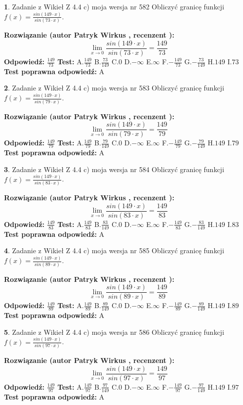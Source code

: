 \documentclass[12pt, a4paper]{article}
\theoremstyle{definition} %
\newtheorem{zad}{}
\newcommand{\zadStart}[1]{\begin{zad}#1\newline}
\newcommand{\zadStop}{\end{zad}}
\newcommand{\rozwStart}[2]{\noindent \textbf{Rozwiązanie (autor #1 , recenzent #2): }\newline}
\newcommand{\rozwStop}{\newline}
\newcommand{\odpStart}{\noindent \textbf{Odpowiedź:}\newline}
\newcommand{\odpStop}{\newline}
\newcommand{\testStart}{\noindent \textbf{Test:}\newline}
\newcommand{\testStop}{\newline}
\newcommand{\kluczStart}{\noindent \textbf{Test poprawna odpowiedź:}\newline}
\newcommand{\kluczStop}{\newline}
\begin{document}
\zadStart{Zadanie z Wikieł Z 4.4 c) moja wersja nr 582}
Obliczyć granicę funkcji $f(x)=\frac{sin(149\cdot x)}{sin(73\cdot x)}$.
\zadStop
\rozwStart{Patryk Wirkus}{}
$$\lim\limits_{x\to 0}\frac{sin(149\cdot x)}{sin(73\cdot x)}=
\frac{149}{73}$$
\rozwStop
\odpStart
$\frac{149}{73}$
\odpStop
\testStart
A.$\frac{149}{73}$
B.$\frac{73}{149}$
C.$0$
D.$-\infty$
E.$\infty$
F.$-\frac{149}{73}$
G.$-\frac{73}{149}$
H.$149$
I.$73$
\testStop
\kluczStart
A
\kluczStop



\zadStart{Zadanie z Wikieł Z 4.4 c) moja wersja nr 583}
Obliczyć granicę funkcji $f(x)=\frac{sin(149\cdot x)}{sin(79\cdot x)}$.
\zadStop
\rozwStart{Patryk Wirkus}{}
$$\lim\limits_{x\to 0}\frac{sin(149\cdot x)}{sin(79\cdot x)}=
\frac{149}{79}$$
\rozwStop
\odpStart
$\frac{149}{79}$
\odpStop
\testStart
A.$\frac{149}{79}$
B.$\frac{79}{149}$
C.$0$
D.$-\infty$
E.$\infty$
F.$-\frac{149}{79}$
G.$-\frac{79}{149}$
H.$149$
I.$79$
\testStop
\kluczStart
A
\kluczStop



\zadStart{Zadanie z Wikieł Z 4.4 c) moja wersja nr 584}
Obliczyć granicę funkcji $f(x)=\frac{sin(149\cdot x)}{sin(83\cdot x)}$.
\zadStop
\rozwStart{Patryk Wirkus}{}
$$\lim\limits_{x\to 0}\frac{sin(149\cdot x)}{sin(83\cdot x)}=
\frac{149}{83}$$
\rozwStop
\odpStart
$\frac{149}{83}$
\odpStop
\testStart
A.$\frac{149}{83}$
B.$\frac{83}{149}$
C.$0$
D.$-\infty$
E.$\infty$
F.$-\frac{149}{83}$
G.$-\frac{83}{149}$
H.$149$
I.$83$
\testStop
\kluczStart
A
\kluczStop



\zadStart{Zadanie z Wikieł Z 4.4 c) moja wersja nr 585}
Obliczyć granicę funkcji $f(x)=\frac{sin(149\cdot x)}{sin(89\cdot x)}$.
\zadStop
\rozwStart{Patryk Wirkus}{}
$$\lim\limits_{x\to 0}\frac{sin(149\cdot x)}{sin(89\cdot x)}=
\frac{149}{89}$$
\rozwStop
\odpStart
$\frac{149}{89}$
\odpStop
\testStart
A.$\frac{149}{89}$
B.$\frac{89}{149}$
C.$0$
D.$-\infty$
E.$\infty$
F.$-\frac{149}{89}$
G.$-\frac{89}{149}$
H.$149$
I.$89$
\testStop
\kluczStart
A
\kluczStop



\zadStart{Zadanie z Wikieł Z 4.4 c) moja wersja nr 586}
Obliczyć granicę funkcji $f(x)=\frac{sin(149\cdot x)}{sin(97\cdot x)}$.
\zadStop
\rozwStart{Patryk Wirkus}{}
$$\lim\limits_{x\to 0}\frac{sin(149\cdot x)}{sin(97\cdot x)}=
\frac{149}{97}$$
\rozwStop
\odpStart
$\frac{149}{97}$
\odpStop
\testStart
A.$\frac{149}{97}$
B.$\frac{97}{149}$
C.$0$
D.$-\infty$
E.$\infty$
F.$-\frac{149}{97}$
G.$-\frac{97}{149}$
H.$149$
I.$97$
\testStop
\kluczStart
A
\kluczStop
\end{document}
